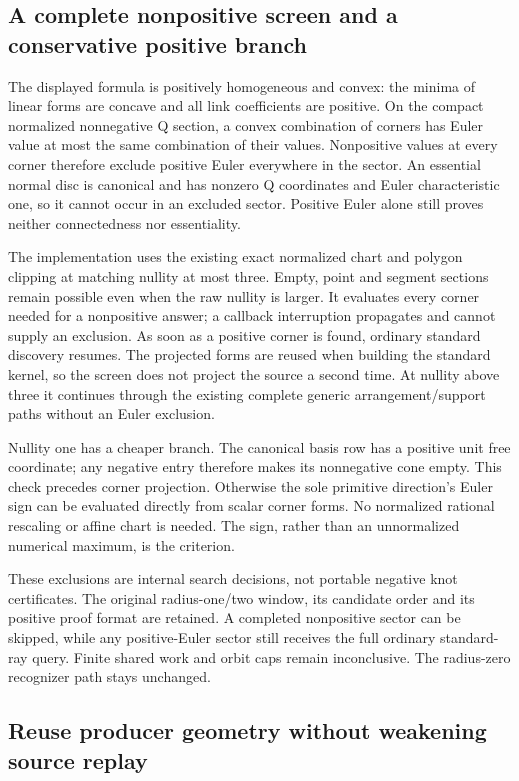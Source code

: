 \subsection{A complete nonpositive screen and a conservative positive branch}

The displayed formula is positively homogeneous and convex: the minima of
linear forms are concave and all link coefficients are positive. On the
compact normalized nonnegative Q section, a convex combination of corners
has Euler value at most the same combination of their values. Nonpositive
values at every corner therefore exclude positive Euler everywhere in the
sector. An essential normal disc is canonical and has nonzero Q coordinates
and Euler characteristic one, so it cannot occur in an excluded sector.
Positive Euler alone still proves neither connectedness nor essentiality.

The implementation uses the existing exact normalized chart and polygon
clipping at matching nullity at most three. Empty, point and segment sections
remain possible even when the raw nullity is larger. It evaluates every
corner needed for a nonpositive answer; a callback interruption propagates
and cannot supply an exclusion. As soon as a positive corner is found,
ordinary standard discovery resumes. The projected forms are reused when
building the standard kernel, so the screen does not project the source a
second time. At nullity above three it continues through the existing
complete generic arrangement/support paths without an Euler exclusion.

Nullity one has a cheaper branch. The canonical basis row has a positive
unit free coordinate; any negative entry therefore makes its nonnegative
cone empty. This check precedes corner projection. Otherwise the sole
primitive direction's Euler sign can be evaluated directly from scalar
corner forms. No normalized rational rescaling or affine chart is needed.
The sign, rather than an unnormalized numerical maximum, is the criterion.

These exclusions are internal search decisions, not portable negative knot
certificates. The original radius-one/two window, its candidate order and
its positive proof format are retained. A completed nonpositive sector can
be skipped, while any positive-Euler sector still receives the full ordinary
standard-ray query. Finite shared work and orbit caps remain inconclusive.
The radius-zero recognizer path stays unchanged.

\subsection{Reuse producer geometry without weakening source replay}

